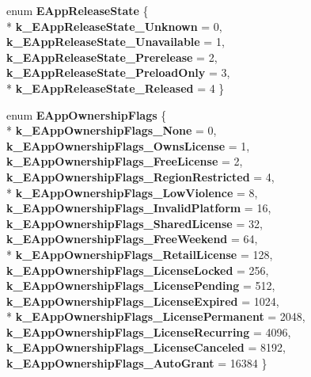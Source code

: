 \begin{DoxyCompactItemize}
\item 
\hypertarget{namespaceValve_1_1Steamworks_a3953f8d72dc8ecb870102445d1d17e4f}{}enum {\bfseries E\+App\+Release\+State} \{ \\*
{\bfseries k\+\_\+\+E\+App\+Release\+State\+\_\+\+Unknown} = 0, 
{\bfseries k\+\_\+\+E\+App\+Release\+State\+\_\+\+Unavailable} = 1, 
{\bfseries k\+\_\+\+E\+App\+Release\+State\+\_\+\+Prerelease} = 2, 
{\bfseries k\+\_\+\+E\+App\+Release\+State\+\_\+\+Preload\+Only} = 3, 
\\*
{\bfseries k\+\_\+\+E\+App\+Release\+State\+\_\+\+Released} = 4
 \}\label{namespaceValve_1_1Steamworks_a3953f8d72dc8ecb870102445d1d17e4f}

\item 
\hypertarget{namespaceValve_1_1Steamworks_af66998371c545a5971dacc3a05e08bdd}{}enum {\bfseries E\+App\+Ownership\+Flags} \{ \\*
{\bfseries k\+\_\+\+E\+App\+Ownership\+Flags\+\_\+\+None} = 0, 
{\bfseries k\+\_\+\+E\+App\+Ownership\+Flags\+\_\+\+Owns\+License} = 1, 
{\bfseries k\+\_\+\+E\+App\+Ownership\+Flags\+\_\+\+Free\+License} = 2, 
{\bfseries k\+\_\+\+E\+App\+Ownership\+Flags\+\_\+\+Region\+Restricted} = 4, 
\\*
{\bfseries k\+\_\+\+E\+App\+Ownership\+Flags\+\_\+\+Low\+Violence} = 8, 
{\bfseries k\+\_\+\+E\+App\+Ownership\+Flags\+\_\+\+Invalid\+Platform} = 16, 
{\bfseries k\+\_\+\+E\+App\+Ownership\+Flags\+\_\+\+Shared\+License} = 32, 
{\bfseries k\+\_\+\+E\+App\+Ownership\+Flags\+\_\+\+Free\+Weekend} = 64, 
\\*
{\bfseries k\+\_\+\+E\+App\+Ownership\+Flags\+\_\+\+Retail\+License} = 128, 
{\bfseries k\+\_\+\+E\+App\+Ownership\+Flags\+\_\+\+License\+Locked} = 256, 
{\bfseries k\+\_\+\+E\+App\+Ownership\+Flags\+\_\+\+License\+Pending} = 512, 
{\bfseries k\+\_\+\+E\+App\+Ownership\+Flags\+\_\+\+License\+Expired} = 1024, 
\\*
{\bfseries k\+\_\+\+E\+App\+Ownership\+Flags\+\_\+\+License\+Permanent} = 2048, 
{\bfseries k\+\_\+\+E\+App\+Ownership\+Flags\+\_\+\+License\+Recurring} = 4096, 
{\bfseries k\+\_\+\+E\+App\+Ownership\+Flags\+\_\+\+License\+Canceled} = 8192, 
{\bfseries k\+\_\+\+E\+App\+Ownership\+Flags\+\_\+\+Auto\+Grant} = 16384
 \}\label{namespaceValve_1_1Steamworks_af66998371c545a5971dacc3a05e08bdd}


\end{DoxyCompactItemize}
